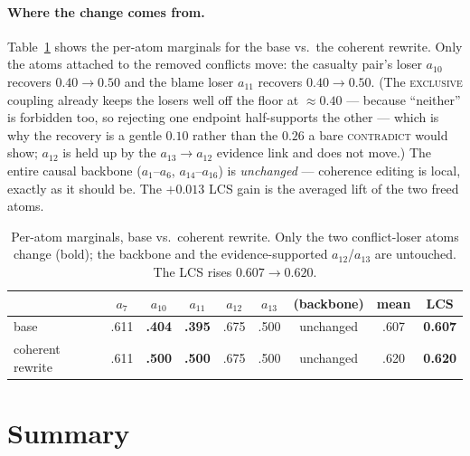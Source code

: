 \documentclass[11pt]{article}
\begin{document}
\paragraph{Where the change comes from.} Table~\ref{tab:margchange} shows the per-atom
marginals for the base vs.\ the coherent rewrite. Only the atoms attached to the removed
conflicts move: the casualty pair's loser $a_{10}$ recovers $0.40\!\to\!0.50$ and the blame
loser $a_{11}$ recovers $0.40\!\to\!0.50$. (The \textsc{exclusive} coupling already keeps the
losers well off the floor at $\approx 0.40$ --- because ``neither'' is forbidden too, so
rejecting one endpoint half-supports the other --- which is why the recovery is a gentle
$0.10$ rather than the $0.26$ a bare \textsc{contradict} would show; $a_{12}$ is held up by
the $a_{13}\!\to\!a_{12}$ evidence link and does not move.) The entire causal backbone
($a_1$--$a_6$, $a_{14}$--$a_{16}$) is \emph{unchanged} --- coherence editing is local, exactly
as it should be. The $+0.013$ LCS gain is the averaged lift of the two freed atoms.

\begin{table}[h]\centering\small
\begin{tabular}{@{}l*{8}{c}@{}}
\toprule
      & $a_7$ & $a_{10}$ & $a_{11}$ & $a_{12}$ & $a_{13}$ & (backbone) & mean & LCS\\
\midrule
base             & .611 & \textbf{.404} & \textbf{.395} & .675 & .500 & unchanged & .607 & \textbf{0.607}\\
coherent rewrite & .611 & \textbf{.500} & \textbf{.500} & .675 & .500 & unchanged & .620 & \textbf{0.620}\\
\bottomrule
\end{tabular}
\caption{Per-atom marginals, base vs.\ coherent rewrite. Only the two conflict-loser atoms
change (bold); the backbone and the evidence-supported $a_{12}$/$a_{13}$ are untouched. The
LCS rises $0.607\!\to\!0.620$.}
\label{tab:margchange}
\end{table}

\section{Summary}
\label{sec:summary}
\end{document}
